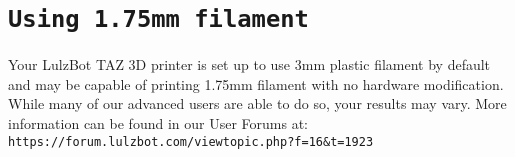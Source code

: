 
\section{\texttt{Using 1.75mm filament}}

Your LulzBot TAZ 3D printer is set up to use 3mm plastic filament by default and may be capable of printing 1.75mm filament with no hardware modification. While many of our advanced users are able to do so, your results may vary.  More information can be found in our User Forums at: \texttt{https://forum.lulzbot.com/viewtopic.php?f=16\&t=1923} 
